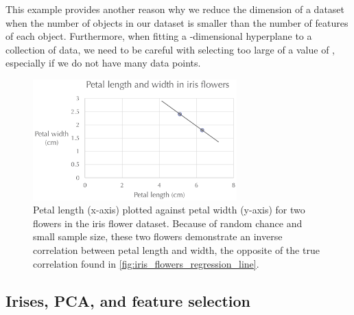 This example provides another reason why we reduce the dimension of a dataset when the number of objects in our dataset is smaller than the number of features of each object. Furthermore, when fitting a -dimensional hyperplane to a collection of data, we need to be careful with selecting too large of a value of , especially if we do not have many data points. \\

\begin{figure}[h]
\centering
\mySfFamily
\includegraphics[width = 0.7\textwidth]{../images/curse_of_dimensionality_two_irises.png}
\caption{Petal length (x-axis) plotted against petal width (y-axis) for two flowers in the iris flower dataset. Because of random chance and small sample size, these two flowers demonstrate an inverse correlation between petal length and width, the opposite of the true correlation found in \autoref{fig:iris_flowers_regression_line}.}
\label{fig:curse_of_dimensionality_two_irises}
\end{figure}

\begin{exercise}\end{exercise}

\subsection{Irises, PCA, and feature selection}

\fudgespace

\begin{exercise}[%
The iris flower dataset has four features. Apply PCA with $d = 2$ to reduce the dimension of this dataset. Then, apply k-NN with \textvar{k} equal to 1 and cross validation with \textvar{f} equal to 10 to the resulting vectors of reduced dimension to obtain a confusion matrix. What are the accuracy, recall, specificity, and precision? How do they compare against the results of using all four iris features from \autoref{fig:iris_confusion_matrix}?
]\end{exercise}


